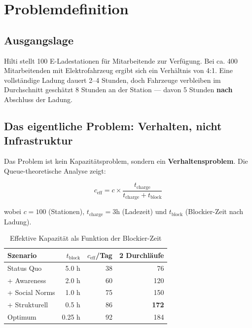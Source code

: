 \documentclass[11pt,a4paper]{article}
\begin{document}
\section{Problemdefinition}

\subsection{Ausgangslage}

Hilti stellt 100 E-Ladestationen f\"ur Mitarbeitende zur Verf\"ugung. Bei ca. 400 Mitarbeitenden mit Elektrofahrzeug ergibt sich ein Verh\"altnis von 4:1. Eine vollst\"andige Ladung dauert 2--4 Stunden, doch Fahrzeuge verbleiben im Durchschnitt gesch\"atzt 8 Stunden an der Station --- davon 5 Stunden \textbf{nach} Abschluss der Ladung.

\subsection{Das eigentliche Problem: Verhalten, nicht Infrastruktur}

Das Problem ist kein Kapazit\"atsproblem, sondern ein \textbf{Verhaltensproblem}. Die Queue-theoretische Analyse zeigt:

\begin{equation}
c_{\text{eff}} = c \times \frac{t_{\text{charge}}}{t_{\text{charge}} + t_{\text{block}}}
\end{equation}

wobei $c = 100$ (Stationen), $t_{\text{charge}} = 3\text{h}$ (Ladezeit) und $t_{\text{block}}$ (Blockier-Zeit nach Ladung).

\begin{table}[H]
\centering
{}
\begin{tabular}{lrrr}
\toprule
\textbf{\color{fadarkblue}Szenario} & \textbf{\color{fadarkblue}$t_{\text{block}}$} & \textbf{\color{fadarkblue}$c_{\text{eff}}$/Tag} & \textbf{\color{fadarkblue}2 Durchl\"aufe} \\
\midrule
Status Quo & 5.0 h & 38 & 76 \\
+ Awareness & 2.0 h & 60 & 120 \\
+ Social Norms & 1.0 h & 75 & 150 \\
+ Strukturell & 0.5 h & 86 & \textbf{172} \\
Optimum & 0.25 h & 92 & 184 \\
\bottomrule
\end{tabular}
\caption{Effektive Kapazit\"at als Funktion der Blockier-Zeit}
\end{table}
\end{document}
